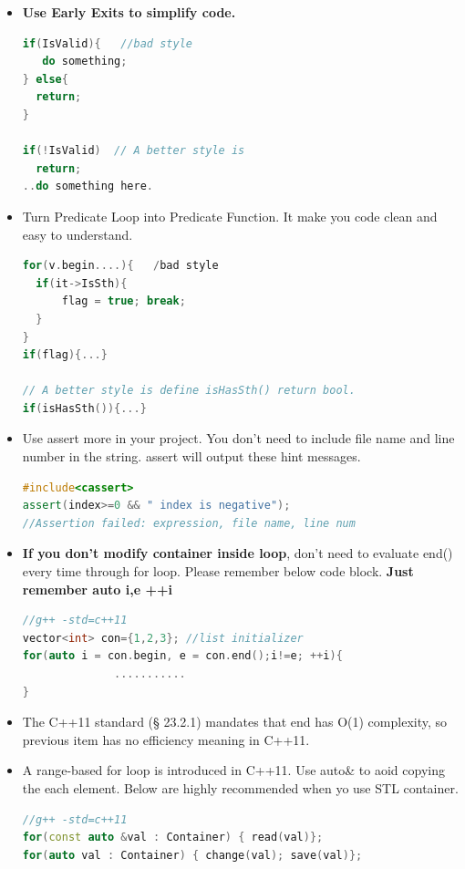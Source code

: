 \documentclass[a4paper,12pt,twoside]{book}
\begin{document}
\begin{itemize}
\item \textbf{Use Early Exits to simplify code.}

\begin{lstlisting}[frame=single, language=c++]
if(IsValid){   //bad style
   do something;
} else{
  return;
}

if(!IsValid)  // A better style is
  return;
..do something here.
\end{lstlisting}

\item Turn Predicate Loop into Predicate Function. It make you code clean and easy to understand.

\begin{lstlisting}[frame=single, language=c++]
for(v.begin....){   /bad style
  if(it->IsSth){
      flag = true; break;
  }
}
if(flag){...}

// A better style is define isHasSth() return bool.
if(isHasSth()){...}
\end{lstlisting}

\item Use assert more in your project. You don't need to include file name and line number in the string. assert will output these hint messages.
\begin{lstlisting}[frame=single, language=c++]
#include<cassert>
assert(index>=0 && " index is negative");
//Assertion failed: expression, file name, line num
\end{lstlisting}

\item \textbf{If you don't modify container inside loop}, don't need to evaluate end() every time through for loop. Please remember below code block. \textbf{Just remember auto i,e ++i}
\begin{lstlisting}[frame=single, language=c++]
//g++ -std=c++11
vector<int> con={1,2,3}; //list initializer
for(auto i = con.begin, e = con.end();i!=e; ++i){
              ...........
}
\end{lstlisting}

\item The C++11 standard (§ 23.2.1) mandates that end has O(1) complexity, so previous item has no efficiency meaning in C++11.

\item A range-based for loop is introduced in C++11. Use auto\& to aoid copying the each element. Below are highly recommended when yo use STL container.

\begin{lstlisting}[frame=single, language=c++]
//g++ -std=c++11
for(const auto &val : Container) { read(val)};
for(auto val : Container) { change(val); save(val)};


\end{lstlisting}
\end{itemize}
\end{document}

